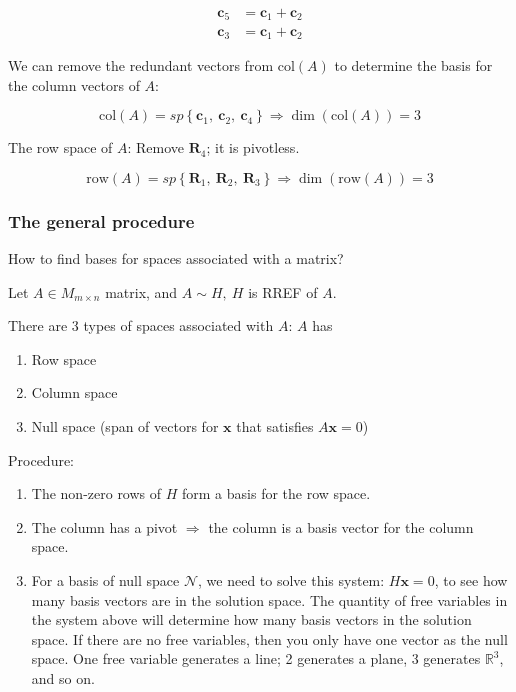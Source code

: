 \documentclass[
]{article}
\begin{document}
\begin{align*}
{\mathbf{c}}_{5} &= {\mathbf{c}}_{1} + {\mathbf{c}}_{2}
 \\
{\mathbf{c}}_{3} &= {\mathbf{c}}_{1} + {\mathbf{c}}_{2}
\end{align*}


We can remove the redundant vectors from $\text{col}(A)$ to determine
the basis for the column vectors of $A$:

$$\text{col}(A) = sp\left\{ {\mathbf{c}}_{1},\ {\mathbf{c}}_{2},\ {\mathbf{c}}_{4} \right\} \Rightarrow \dim\left( \text{col}(A) \right) = 3$$

The row space of $A$: Remove ${\mathbf{R}}_{4}$; it is
pivotless.

$$\text{row}(A) = sp\left\{ {\mathbf{R}}_{1},\ {\mathbf{R}}_{2},\ {\mathbf{R}}_{3} \right\} \Rightarrow \dim\left( \text{row}(A) \right) = 3$$


\subsubsection{The general procedure}

How to find bases for spaces associated with a matrix?

Let $A \in M_{m \times n}$ matrix, and $A\sim H,\ H$ is RREF of
$A$.

There are 3 types of spaces associated with $A$: $A$ has

\begin{enumerate}
\def\labelenumi{\alph{enumi})}
\item
  Row space
\item
  Column space
\item
  Null space (span of vectors for $\mathbf{x}$ that satisfies
  $A\mathbf{x} = 0$)
\end{enumerate}

Procedure:

\begin{enumerate}
\def\labelenumi{\alph{enumi})}
\item
  The non-zero rows of $H$ form a basis for the row space.
\item
  The column has a pivot $\Rightarrow$ the column is a basis vector
  for the column space.
\item
  For a basis of null space $\mathcal{N}$, we need to solve this
  system: $H\mathbf{x} = 0$, to see how many basis vectors are in
  the solution space. The quantity of free variables in the system above
  will determine how many basis vectors in the solution space. If there
  are no free variables, then you only have one vector as the null
  space. One free variable generates a line; 2 generates a plane, 3
  generates $\mathbb{R}^{3}$, and so on.
\end{enumerate}
\end{document}
